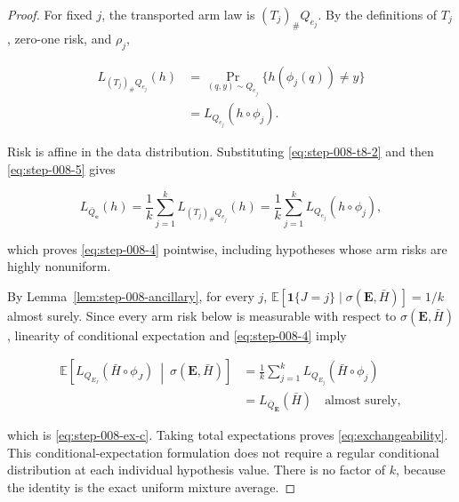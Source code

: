 \begin{proof}

For fixed \(j\), the transported arm law is
\((T_j)_\#Q_{e_j}\).  By the definitions of \(T_j\), zero-one risk,
and \(\rho_j\),

\[
\begin{aligned}
L_{(T_j)_\#Q_{e_j}}(h)
&=\Pr_{(q,y)\sim Q_{e_j}}
  \{h(\phi_j(q))\ne y\}\\
&=L_{Q_{e_j}}(h\circ\phi_j).
\end{aligned}
\tag{5}\label{eq:step-008-5}
\]

Risk is affine in the data distribution.  Substituting \eqref{eq:step-008-t8-2} and
then \eqref{eq:step-008-5} gives

\[
L_{\bar Q_{\mathbf e}}(h)
=\frac1k\sum_{j=1}^kL_{(T_j)_\#Q_{e_j}}(h)
=\frac1k\sum_{j=1}^kL_{Q_{e_j}}(h\circ\phi_j),
\tag{6}\label{eq:step-008-6}
\]

which proves \eqref{eq:step-008-4} pointwise, including hypotheses whose arm risks are
highly nonuniform.

By Lemma~\ref{lem:step-008-ancillary}, for every \(j\),
\(\mathbb E[\mathbf1\{J=j\}\mid
\sigma(\mathbf E,\bar H)]=1/k\) almost surely.  Since every arm risk
below is measurable with respect to \(\sigma(\mathbf E,\bar H)\),
linearity of conditional expectation and \eqref{eq:step-008-4} imply

\[
\begin{aligned}
\mathbb E\!\left[
L_{Q_{E_J}}(\bar H\circ\phi_J)
\ \middle|\ \sigma(\mathbf E,\bar H)
\right]
&=\frac1k\sum_{j=1}^k
L_{Q_{E_j}}(\bar H\circ\phi_j)\\
&=L_{\bar Q_{\mathbf E}}(\bar H)
\quad\text{almost surely},
\end{aligned}
\tag{7}\label{eq:step-008-7}
\]

which is \eqref{eq:step-008-ex-c}.  Taking total expectations proves \eqref{eq:exchangeability}.  This
conditional-expectation formulation does not require a regular
conditional distribution at each individual hypothesis value.  There
is no factor of \(k\), because the identity is the exact uniform
mixture average.

\end{proof}


